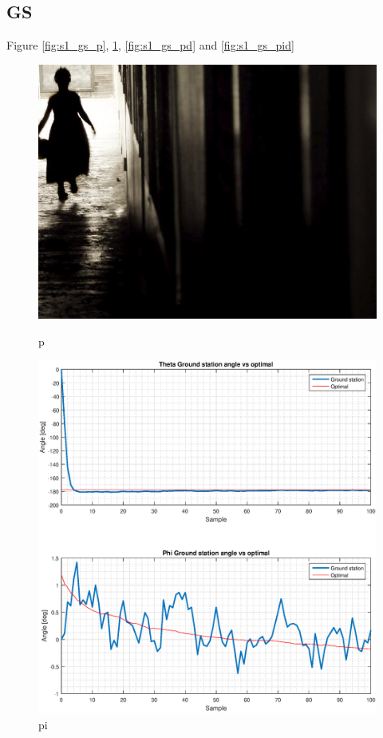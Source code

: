 \subsection{GS}
Figure \ref{fig:s1_gs_p}, \ref{fig:s1_gs_pi}, \ref{fig:s1_gs_pd} and \ref{fig:s1_gs_pid}

\begin{figure}[H]
\begin{minipage}[t]{0.45\textwidth}
\includegraphics[width=\linewidth]{figures/randomfigure.jpg}
\caption{p}
\label{fig:s1_gs_p}
\end{minipage}
\hspace{\fill}
\begin{minipage}[t]{0.45\textwidth}
\includegraphics[width=\linewidth]{figures/s1_pi_gs_theta_phi_optimal.eps}
\caption{pi}
\label{fig:s1_gs_pi}
\end{minipage}


\end{figure}
